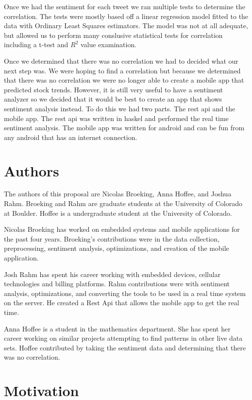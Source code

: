 \documentclass{acm_proc_article-sp}
\begin{document}
Once we had the sentiment for each tweet we ran multiple tests to determine the
correlation.  The tests were mostly based off a linear regression model fitted
to the data with Ordinary Least Squares estimators. The model was not at all
adequate, but allowed us to perform many conslusive statistical tests for
correlation including a t-test and $R^2$ value examination. 

Once we determined that there was no correlation we had to decided what our
next step was. We were hoping to find a correlation but because we determined
that there was no correlation we were no longer able to create a mobile app
that predicted stock trends. However, it is still very useful to have a
sentiment analyzer so we decided that it would be best to create an app that
shows sentiment analysis instead. To do this we had two parts.  The rest api
and the mobile app. The rest api was written in haskel and performed the real
time sentiment analysis.  The mobile app was written for android and can be fun
from any android that has an internet connection. 


\section{Authors}

The authors of this proposal are Nicolas Broeking, Anna
Hoffee, and Joshua Rahm. Broeking and Rahm are graduate students at the
University of Colorado at Boulder. Hoffee is a undergraduate student at the
University of Colorado.

 Nicolas Broeking has worked on embedded systems and mobile applications for
the past four years. Broeking's contributions were in the data collection,
preprocessing, sentiment analysis, optimizations, and creation of the mobile
application. 

Josh Rahm has spent his career working with embedded devices, cellular
technologies and billing platforms. Rahm contributions were with sentiment
analysis, optimizations, and converting the tools to be used in a real time
system on the server. He created a Rest Api that allows the mobile app to get
the real time.

Anna Hoffee is a student in the mathematics department. She has spent her
career working on similar projects attempting to find patterns in other live
data sets. Hoffee contributed by taking the sentiment data and determining that
there was no correlation.

\section{Motivation}
\end{document}
